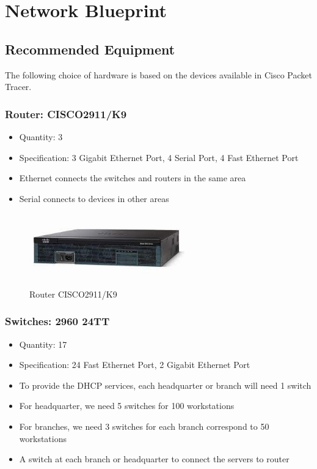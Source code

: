 \section{Network Blueprint}
\subsection{Recommended Equipment}
The following choice of hardware is based on the devices available in Cisco Packet Tracer.
\subsubsection{Router: CISCO2911/K9 }
\begin{itemize}
  \item Quantity: 3
  \item Specification: 3 Gigabit Ethernet Port, 4 Serial Port, 4 Fast Ethernet Port
  \item Ethernet connects the switches and routers in the same area
  \item Serial connects to devices in other areas
\end{itemize}
\begin{figure}[H]
  \centering
  \includegraphics[width=0.6\textwidth]{./assets/router.png}
  \caption{Router CISCO2911/K9}
\end{figure}

\subsubsection{Switches: 2960 24TT}
\begin{itemize}
  \item Quantity: 17
  \item Specification: 24 Fast Ethernet Port, 2 Gigabit Ethernet Port
  \item To provide the DHCP services, each headquarter or branch will need 1 switch
  \item For headquarter, we need 5 switches for 100 workstations
  \item For branches, we need 3 switches for each branch correspond to 50 workstations
  \item A switch at each branch or headquarter to connect the servers to router
\end{itemize}

